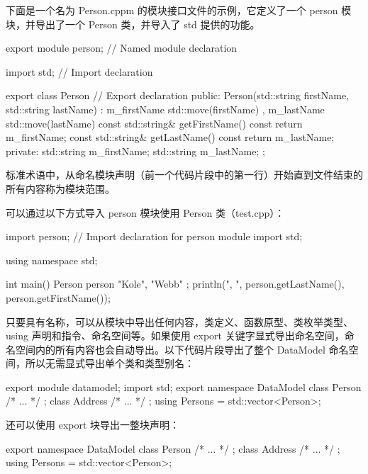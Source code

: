 下面是一个名为 Person.cppm 的模块接口文件的示例，它定义了一个 person 模块，并导出了一个 Person 类，并导入了 std 提供的功能。

\begin{cpp}
export module person; // Named module declaration

import std; // Import declaration

export class Person // Export declaration
{
    public:
        Person(std::string firstName, std::string lastName)
            : m_firstName { std::move(firstName) }
            , m_lastName { std::move(lastName) } { }
        const std::string& getFirstName() const { return m_firstName; }
        const std::string& getLastName() const { return m_lastName; }
    private:
        std::string m_firstName;
        std::string m_lastName;
};
\end{cpp}

标准术语中，从命名模块声明（前一个代码片段中的第一行）开始直到文件结束的所有内容称为模块范围。

可以通过以下方式导入 person 模块使用 Person 类（test.cpp）：

\begin{cpp}
import person; // Import declaration for person module
import std;

using namespace std;

int main()
{
    Person person { "Kole", "Webb" };
    println("{}, {}", person.getLastName(), person.getFirstName());
}
\end{cpp}

只要具有名称，可以从模块中导出任何内容，类定义、函数原型、类枚举类型、using 声明和指令、命名空间等。如果使用 export 关键字显式导出命名空间，命名空间内的所有内容也会自动导出。以下代码片段导出了整个 DataModel 命名空间，所以无需显式导出单个类和类型别名：

\begin{cpp}
export module datamodel;
import std;
export namespace DataModel
{
    class Person { /* ... */ };
    class Address { /* ... */ };
    using Persons = std::vector<Person>;
}
\end{cpp}

还可以使用 export 块导出一整块声明：

\begin{cpp}
export
{
    namespace DataModel
    {
        class Person { /* ... */ };
        class Address { /* ... */ };
        using Persons = std::vector<Person>;
    }
}
\end{cpp}




